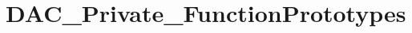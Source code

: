 \hypertarget{group___d_a_c___private___function_prototypes}{\section{D\-A\-C\-\_\-\-Private\-\_\-\-Function\-Prototypes}
\label{group___d_a_c___private___function_prototypes}
}
